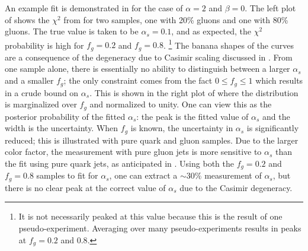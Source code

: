 %
An example fit is demonstrated in  for the case of $\alpha=2$ and $\beta = 0$.
%
The left plot of  shows the $\chi^2$ from  for two samples, one with 20\% gluons and one with 80\% gluons.
%
The true value is taken to be $\alpha_s=0.1$, and as expected, the $\chi^2$ probability is high for $f_g=0.2$ and $f_g=0.8$.%
\footnote{It is not necessarily peaked at this value because this is the result of one pseudo-experiment.  Averaging over many pseudo-experiments results in peaks at $f_g=0.2$ and $0.8$.}
%
The banana shapes of the curves are a consequence of the degeneracy due to Casimir scaling discussed in .
%
From one sample alone, there is essentially no ability to distinguish between a larger $\alpha_s$ and a smaller $f_g$; the only constraint comes from the fact $0\leq f_g\leq 1$ which results in a crude bound on $\alpha_s$.
%
This is shown in the right plot of  where the distribution is marginalized over $f_g$ and normalized to unity.
%
One can view this as the posterior probability of the fitted $\alpha_s$: the peak is the fitted value of $\alpha_s$ and the width is the uncertainty.
%
When $f_g$ is known, the uncertainty in $\alpha_s$ is significantly reduced; this is illustrated with pure quark and gluon samples.
%
Due to the larger color factor, the measurement with pure gluon jets is more sensitive to $\alpha_s$ than the fit using pure quark jets, as anticipated in .
%
Using both the $f_g=0.2$ and $f_g=0.8$ samples to fit for $\alpha_s$, one can extract a $\sim 30\%$ measurement of $\alpha_s$, but there is no clear peak at the correct value of $\alpha_s$ due to the Casimir degeneracy.  


